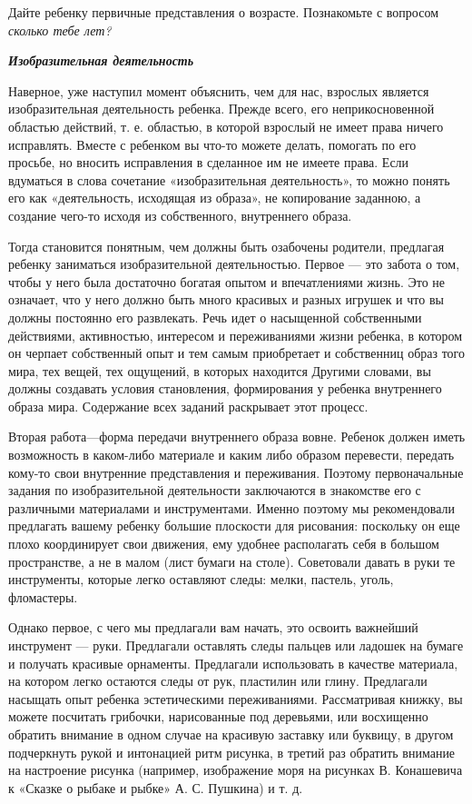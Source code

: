 \documentclass[a5paper]{book}
\renewcommand{\emph}[1]{\textit{#1}}
\begin{document}
Дайте ребенку первичные представления о возрасте. Познакомьте с вопросом
\emph{сколько тебе лет?}

\emph{\textbf{Изобразительная деятельность}}

Наверное, уже наступил момент объяснить, чем для нас, взрослых является
изобразительная деятельность ребенка. Прежде всего, его неприкосновенной
областью действий, т. е. областью, в которой взрослый не имеет права
ничего исправлять. Вместе с ребенком вы что-то можете делать, помогать
по его просьбе, но вносить исправления в сделанное им не имеете права.
Если вдуматься в слова сочетание «изобразительная деятельность», то
можно понять его как «деятельность, исходящая из образа», не копирование
заданною, а создание чего-то исходя из собственного, внутреннего образа.

Тогда становится понятным, чем должны быть озабочены родители, предлагая
ребенку заниматься изобразительной деятельностью. Первое --- это забота
о том, чтобы у него была достаточно богатая опытом и впечатлениями
жизнь. Это не означает, что у него должно быть много красивых и разных
игрушек и что вы должны постоянно его развлекать. Речь идет о насыщенной
собственными действиями, активностью, интересом и переживаниями жизни
ребенка, в котором он черпает собственный опыт и тем самым приобретает и
собственниц образ того мира, тех вещей, тех ощущений, в которых
находится Другими словами, вы должны создавать условия становления,
формирования у ребенка внутреннего образа мира. Содержание всех заданий
раскрывает этот процесс.

Вторая работа---форма передачи внутреннего образа вовне. Ребенок должен
иметь возможность в каком-либо материале и каким либо образом перевести,
передать кому-то свои внутренние представления и переживания. Поэтому
первоначальные задания по изобразительной деятельности заключаются в
знакомстве его с различными материалами и инструментами. Именно поэтому
мы рекомендовали предлагать вашему ребенку большие плоскости для
рисования: поскольку он еще плохо координирует свои движения, ему
удобнее располагать себя в большом пространстве, а не в малом (лист
бумаги на столе). Советовали давать в руки те инструменты, которые легко
оставляют следы: мелки, пастель, уголь, фломастеры.

Однако первое, с чего мы предлагали вам начать, это освоить важнейший
инструмент --- руки. Предлагали оставлять следы пальцев или ладошек на
бумаге и получать красивые орнаменты. Предлагали использовать в качестве
материала, на котором легко остаются следы от рук, пластилин или глину.
Предлагали насыщать опыт ребенка эстетическими переживаниями.
Рассматривая книжку, вы можете посчитать грибочки, нарисованные под
деревьями, или восхищенно обратить внимание в одном случае на красивую
заставку или буквицу, в другом подчеркнуть рукой и интонацией ритм
рисунка, в третий раз обратить внимание на настроение рисунка (например,
изображение моря на рисунках В. Конашевича к «Сказке о рыбаке и рыбке»
А. С. Пушкина) и т. д.
\end{document}
